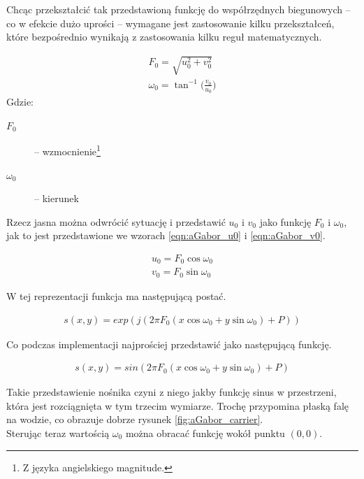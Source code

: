 Chcąc przekształcić tak przedstawioną funkcję do współrzędnych biegunowych -- co w efekcie dużo uprości -- wymagane jest zastosowanie kilku przekształceń, które bezpośrednio wynikają z zastosowania kilku reguł matematycznych.

\begin{align}\label{eqn:aGabor_F0}
F_0 = \sqrt{u_0^2 + v_0^2}\\
\label{eqn:aGabor_w0}
\omega_0 = \tan^{-1} \Big(  \frac{v_0}{u_0}\Big)
\end{align}
Gdzie: 
\begin{description}
\item [$F_0$] -- wzmocnienie\footnote{Z języka angielskiego magnitude.}
\item [$\omega_0$] -- kierunek
\end{description}

Rzecz jasna można odwrócić sytuację i przedstawić $u_0$ i $v_0$ jako funkcję $F_0$ i $\omega_0$, jak to jest przedstawione we wzorach \ref{eqn:aGabor_u0} i \ref{eqn:aGabor_v0}.

\begin{align}\label{eqn:aGabor_u0}
u_0 = F_0 \cos\omega_0\\
\label{eqn:aGabor_v0}
v_0 = F_0 \sin\omega_0
\end{align}

W tej reprezentacji funkcja ma następującą postać.

\begin{align}\label{eqn:aGabor_polar}
s(x, y) = exp(j(2\pi F_0(x\cos\omega_0 + y\sin\omega_0)+P))
\end{align}

Co podczas implementacji najprościej przedstawić jako następującą funkcję.

\begin{align}\label{eqn:aGabor_implementacja}
s(x, y) = sin(2\pi F_0(x\cos\omega_0 + y\sin\omega_0)+P)
\end{align}

Takie przedstawienie nośnika czyni z niego jakby funkcję sinus w przestrzeni, która jest rozciągnięta w tym trzecim wymiarze. Trochę przypomina płaską falę na wodzie, co obrazuje dobrze rysunek \ref{fig:aGabor_carrier}.\\
Sterując teraz wartością $\omega_0$ można obracać funkcję wokół punktu $(0, 0)$.


